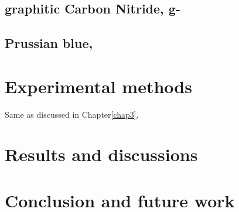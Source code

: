 \subsection*{graphitic Carbon Nitride, g-}
\subsection*{Prussian blue, }
\section{Experimental methods}
Same as discussed in Chapter\ref{chap3}.
\section{Results and discussions}
\section{Conclusion and future work}
